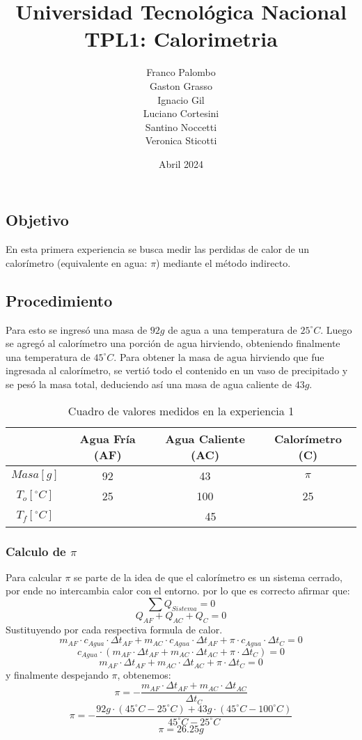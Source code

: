 \documentclass[12pt]{report}
\title{Universidad Tecnológica Nacional\\TPL1: Calorimetria}
\author{
Franco Palombo\\
Gaston Grasso\\
Ignacio Gil\\
Luciano Cortesini\\
Santino Noccetti\\
Veronica Sticotti
}
\date{Abril 2024}
\begin{document}
\maketitle

\chapter{}
\section{Objetivo}
En esta primera experiencia se busca medir las perdidas de calor de un calorímetro (equivalente en agua: $\pi$) mediante el método indirecto. 

\section{Procedimiento}
Para esto se ingresó una masa de $92 g$ de agua a una temperatura de $25^\circ C$.
Luego se agregó al calorímetro una porción de agua hirviendo, obteniendo finalmente una temperatura de  $45^\circ C$. 
Para obtener la masa de agua hirviendo que fue ingresada al calorímetro, se vertió todo el contenido en un vaso de precipitado y se pesó la masa total, deduciendo así una masa de agua caliente de $43g$.
\begin{table}[htbp]
    \centering
    \begin{tabular}{|c|c|c|c|}
    \hline
    & Agua Fría (AF) & Agua Caliente (AC) & Calorímetro (C)\\
    \hline
    $Masa[g]$ & 92 & 43 & $\pi$ \\
    \hline
   $T_o[^\circ C]$ & 25 & 100 & 25\\
    \hline
     $T_f[^\circ C]$ & \multicolumn{3}{|c|}{45}\\
    \hline
    \end{tabular}
    \caption{Cuadro de valores medidos en la experiencia 1}
    \label{tab:datos experiencia 1}
\end{table}
\subsection{Calculo de $\pi$}
Para calcular $\pi$ se parte de la idea de que el calorímetro es un sistema cerrado, por ende no intercambia calor con el entorno. por lo que es correcto afirmar que:
$$\sum Q_{Sistema}= 0$$
$$Q_{AF} + Q_{AC} + Q_{C} = 0$$
\hspace{1cm} Sustituyendo por cada respectiva formula de calor.
$$m_{AF} \cdot c_{Agua} \cdot {\Delta t}_{AF} + m_{AC} \cdot c_{Agua} \cdot {\Delta t}_{AF} + \pi \cdot c_{Agua} \cdot {\Delta t}_{C} = 0$$
$$c_{Agua} \cdot (m_{AF}  \cdot {\Delta t}_{AF} + m_{AC} \cdot {\Delta t}_{AC} + \pi \cdot {\Delta t}_C) = 0$$
$$m_{AF} \cdot  {\Delta t}_{AF} + m_{AC} \cdot  {\Delta t}_{AC} + \pi \cdot {\Delta t}_C= 0$$
\hspace{1cm} y finalmente despejando $\pi$, obtenemos:
$$\pi =-\frac{m_{AF} \cdot  {\Delta t}_{AF} + m_{AC} \cdot  {\Delta t}_{AC}}{{\Delta t}_C}$$
$$\pi =-\frac{92g \cdot (45^\circ C-25^\circ C)+ 43g \cdot (45^\circ C-100^\circ C)}{45^\circ C-25^\circ C}$$
$$\pi = 26.25g$$
\end{document}
